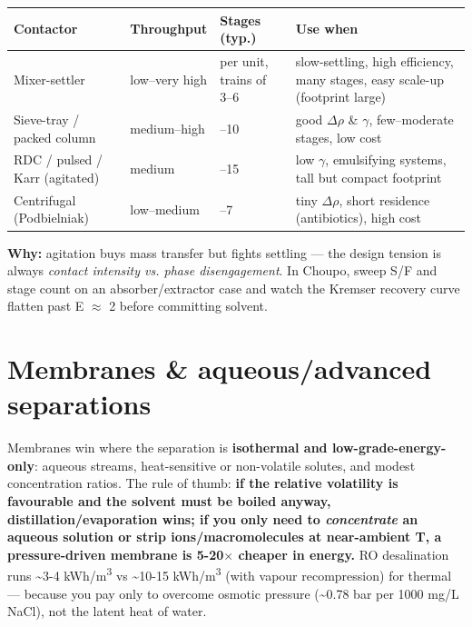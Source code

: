 \documentclass[11pt,a4paper]{article}
\begin{document}
\begin{longtable}[]{@{}>{\raggedright\arraybackslash}p{\dimexpr(\linewidth-8\tabcolsep)/4\relax}>{\raggedright\arraybackslash}p{\dimexpr(\linewidth-8\tabcolsep)/4\relax}>{\raggedright\arraybackslash}p{\dimexpr(\linewidth-8\tabcolsep)/4\relax}>{\raggedright\arraybackslash}p{\dimexpr(\linewidth-8\tabcolsep)/4\relax}@{}}
\toprule\noalign{}
Contactor & Throughput & Stages (typ.) & Use when \\
\midrule\noalign{}
\endhead
\bottomrule\noalign{}
\endlastfoot
Mixer-settler & low--very high & 1 per unit, trains of 3--6 &
slow-settling, high efficiency, many stages, easy scale-up (footprint
large) \\
Sieve-tray / packed column & medium--high & 5--10 & good \(\Delta\)\(\rho\) \& \(\gamma\),
few--moderate stages, low cost \\
RDC / pulsed / Karr (agitated) & medium & 8--15 & low \(\gamma\), emulsifying
systems, tall but compact footprint \\
Centrifugal (Podbielniak) & low--medium & 3--7 & tiny \(\Delta\)\(\rho\), short
residence (antibiotics), high cost \\
\end{longtable}

\textbf{Why:} agitation buys mass transfer but fights settling --- the
design tension is always \emph{contact intensity vs. phase
disengagement}. In Choupo, sweep S/F and stage count on an
absorber/extractor case and watch the Kremser recovery curve flatten
past E \(\approx\) 2 before committing solvent.

\hypertarget{membranes--aqueousadvanced-separations}{%
\section{Membranes \& aqueous/advanced
separations}\label{membranes--aqueousadvanced-separations}}

Membranes win where the separation is \textbf{isothermal and
low-grade-energy-only}: aqueous streams, heat-sensitive or non-volatile
solutes, and modest concentration ratios. The rule of thumb: \textbf{if
the relative volatility is favourable and the solvent must be boiled
anyway, distillation/evaporation wins; if you only need to
\emph{concentrate} an aqueous solution or strip ions/macromolecules at
near-ambient T, a pressure-driven membrane is 5-20\(\times\) cheaper in energy.}
RO desalination runs \textasciitilde3-4 kWh/m\textsuperscript{3} vs \textasciitilde10-15
kWh/m\textsuperscript{3} (with vapour recompression) for thermal --- because you pay only
to overcome osmotic pressure (\textasciitilde0.78 bar per 1000 mg/L
NaCl), not the latent heat of water.
\end{document}
